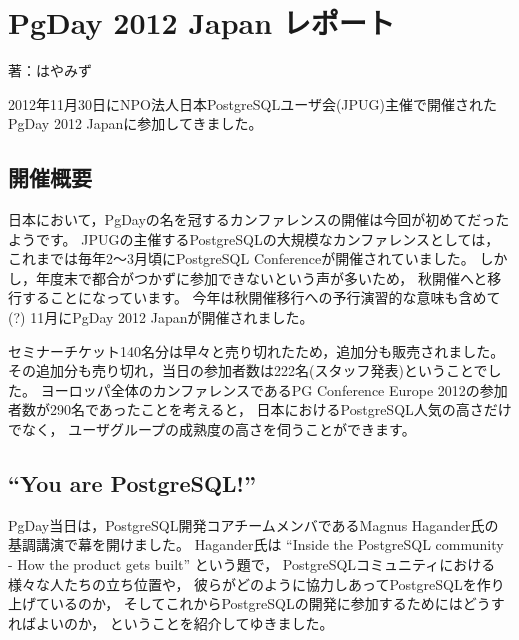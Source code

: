 
\chapter{PgDay 2012 Japan レポート}

\begin{flushright}
 {\headfont 著：はやみず}
\end{flushright}

2012年11月30日にNPO法人日本PostgreSQLユーザ会(JPUG)主催で開催されたPgDay 2012 Japanに参加してきました。

\section{開催概要}

日本において，PgDayの名を冠するカンファレンスの開催は今回が初めてだったようです。
JPUGの主催するPostgreSQLの大規模なカンファレンスとしては，
これまでは毎年2〜3月頃にPostgreSQL Conferenceが開催されていました。
しかし，年度末で都合がつかずに参加できないという声が多いため，
秋開催へと移行することになっています。
今年は秋開催移行への予行演習的な意味も含めて(?)
11月にPgDay 2012 Japanが開催されました。

セミナーチケット140名分は早々と売り切れたため，追加分も販売されました。
その追加分も売り切れ，当日の参加者数は222名(スタッフ発表)ということでした。
ヨーロッパ全体のカンファレンスであるPG Conference Europe 2012の参加者数が290名であったことを考えると，
日本におけるPostgreSQL人気の高さだけでなく，
ユーザグループの成熟度の高さを伺うことができます。


\section{``You are PostgreSQL!''}

PgDay当日は，PostgreSQL開発コアチームメンバであるMagnus Hagander氏の基調講演で幕を開けました。
Hagander氏は ``Inside the PostgreSQL community - How the product gets built'' という題で，
PostgreSQLコミュニティにおける様々な人たちの立ち位置や，
彼らがどのように協力しあってPostgreSQLを作り上げているのか，
そしてこれからPostgreSQLの開発に参加するためにはどうすればよいのか，
ということを紹介してゆきました。

